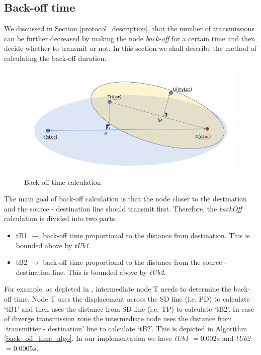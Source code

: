 \subsection{Back-off time}
\label{back_off_time}

We discussed in Section \ref{protocol_description}, that the number of transmissions can be further decreased by making the node \emph{back-off} for a certain time and then decide whether to transmit or not. In this section we shall describe the method of calculating the back-off duration. 


\begin{figure}[hbtp]
    \centering
    \includegraphics[width=1\textwidth]{Chapter-4/figs/back_off_time_calc}
    \caption{Back-off time calculation}
    \label{fig:back_off_time_calculation}
\end{figure}


The main goal of back-off calculation is that the node closer to the destination and the source - destination line should transmit first. Therefore, the \emph{backOff} calculation is divided into two parts.
\begin{itemize}
    \item tB1 $\rightarrow$ back-off time proportional to the distance from destination. This is bounded above by \emph{tUb1}. 
    \item tB2 $\rightarrow$ back-off time proportional to the distance from the source - destination line. This is bounded above by \emph{tUb2}.
\end{itemize}

For example, as depicted in , intermediate node T needs to determine the back-off time. Node T uses the displacement across the SD line (i.e. PD) to calculate `tB1' and then uses the distance from SD line (i.e. TP) to calculate `tB2'.
In case of diverge transmission zone the intermediate node uses the distance from `transmitter - destination' line to calculate `tB2'. This is depicted in Algorithm \ref{back_off_time_algo}. In our implementation we have \emph{tUb1 $= 0.002 s$} and \emph{tUb2 $ = 0.0005 s$}.

